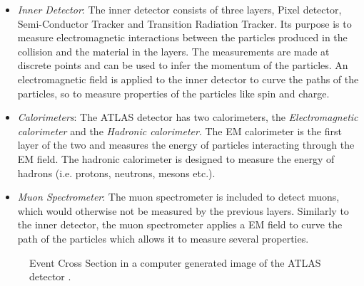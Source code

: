 \begin{itemize}
    \item \emph{Inner Detector}: The inner detector consists of three layers, Pixel detector, Semi-Conductor Tracker 
          and Transition Radiation Tracker. Its purpose is to measure electromagnetic interactions between the particles 
          produced in the collision and the material in the layers. The measurements are made at discrete points and can be 
          used to infer the momentum of the particles. An electromagnetic field is applied to the inner detector
          to curve the paths of the particles, so to measure properties of the particles like spin and charge.  
    \item \emph{Calorimeters}: The ATLAS detector has two calorimeters, the \emph{Electromagnetic calorimeter} and the 
           \emph{Hadronic calorimeter}. The \ac{EM} calorimeter is the first layer of the two and measures the energy of 
           particles interacting through the \ac{EM} field. The hadronic calorimeter is designed to measure the energy of 
           hadrons (i.e. protons, neutrons, mesons etc.).
    \item \emph{Muon Spectrometer}: The muon spectrometer is included to detect muons, which would otherwise not be measured 
           by the previous layers. Similarly to the inner detector, the muon spectrometer applies a \ac{EM} field to 
           curve the path of the particles which allows it to measure several properties. 
\end{itemize}
\begin{figure}
    \centering
    \caption{Event Cross Section in a computer generated image of the
    ATLAS detector \cite{PDetector}.}
    \label{fig:detector}
\end{figure}

